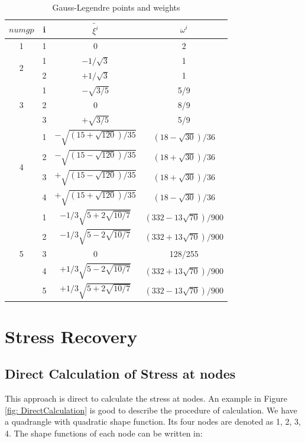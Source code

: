 \begin{table}
	\begin{center}
		\caption{Gauss-Legendre points and weights}\label{tab: Gauss table}
		\begin{tabular}{cccc}
			$numgp$         & i & $\tilde{\xi^i}$ & $\omega^i$  \\ \hline
			1                           &1& 0 & 2   \\ \hline
			\multirow{2}{*}{2} &1& $-1/\sqrt{3}$ & 1   \\
			&2& $+1/\sqrt{3}$ & 1   \\ \hline
			\multirow{3}{*}{3} &1& $-\sqrt{3/5}$ &5/9 \\
			&2& 0                &8/9 \\
			&3& $+\sqrt{3/5}$ &5/9 \\ \hline
			\multirow{4}{*}{4}&1& $-\sqrt{\left(15+\sqrt{120}\right)/35}$ & $\left(18-\sqrt{30}\right)/36$ \\
			&2& $-\sqrt{\left(15-\sqrt{120}\right)/35}$ & $\left(18+\sqrt{30}\right)/36$ \\
			&3& $+\sqrt{\left(15-\sqrt{120}\right)/35}$ & $\left(18+\sqrt{30}\right)/36$ \\
			&4& $+\sqrt{\left(15+\sqrt{120}\right)/35}$ & $\left(18-\sqrt{30}\right)/36$ \\ \hline
			\multirow{5}{*}{5}&1& $-1/3\sqrt{5+2\sqrt{10/7}}$ & $\left(332-13\sqrt{70}\right)/900$ \\
			&2& $-1/3\sqrt{5-2\sqrt{10/7}}$ & $\left(332+13\sqrt{70}\right)/900$ \\
			&3& 0 & 128/255 \\
			&4& $+1/3\sqrt{5-2\sqrt{10/7}}$ & $\left(332+13\sqrt{70}\right)/900$ \\
			&5& $+1/3\sqrt{5+2\sqrt{10/7}}$ & $\left(332-13\sqrt{70}\right)/900$ \\ \hline
		\end{tabular}
	\end{center}	
\end{table}

\section{Stress Recovery}
\subsection{Direct Calculation of Stress at nodes}
This approach is direct to calculate the stress at nodes. An example in Figure \ref{fig: DirectCalculation} is good to describe the procedure of calculation. We have a quadrangle with quadratic shape function. Its four nodes are denoted as 1, 2, 3, 4. The shape functions of each node can be written in:

